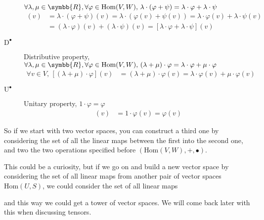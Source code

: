 \begin{description}
  $\forall\lambda,\mu\in\symbb{R}, \forall\varphi\in\text{Hom}(V,W), \,
  \lambda\cdot(\varphi + \psi) = \lambda\cdot\varphi + \lambda\cdot\psi$
  \begin{align*}
    [\lambda\cdot(\varphi + \psi)](v)
    &= \lambda\cdot (\varphi + \psi)(v)
      = \lambda\cdot (\varphi(v) + \psi(v))
      = \lambda\cdot\varphi(v) + \lambda\cdot\psi(v)\\
    &= (\lambda\cdot\varphi)(v) + (\lambda\cdot\psi)(v)
      = [\lambda\cdot\varphi + \lambda\cdot\psi](v)
  \end{align*}
\item[$\text{D}^\vysmblkcircle$] Distributive property,
  $\forall\lambda,\mu\in\symbb{R}, \forall\varphi\in\text{Hom}(V,W), \,
  (\lambda+\mu)\cdot\varphi = \lambda\cdot\varphi + \mu\cdot\varphi$
  \begin{align*}
    \forall v\in V,\,
    [(\lambda + \mu) \cdot\varphi](v)
    &= (\lambda + \mu) \cdot \varphi(v)
      = \lambda\cdot \varphi(v) + \mu\cdot\varphi(v)
  \end{align*}
\item[$\text{U}^\vysmblkcircle$] Unitary property, $1\cdot\varphi = \varphi$
  \begin{align*}
    [1\cdot\varphi](v)
    &= 1\cdot \varphi(v)
      = \varphi(v)
  \end{align*}

\end{description}

So if we start with two vector spaces, you can construct a third one by considering the set
of all the linear maps between the first into the second one, and two the two operations
specified before $(\text{Hom}(V,W),+,\vysmblkcircle)$.

This could be a curiosity, but if we go on and build a new vector space by considering the set of
all linear maps from another pair of vector spaces $\text{Hom}(U,S)$, we could consider the set of
all linear maps
\begin{center}
\end{center}
and this way we could get a tower of vector spaces.
We will come back later with this when discussing tensors.

